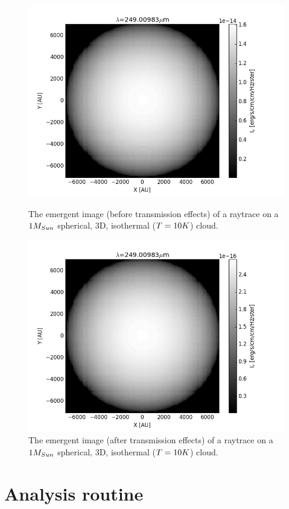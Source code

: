 \documentclass{report}
\begin{document}
\begin{figure}[!htb]
  \includegraphics[width=\linewidth]{../img/figure_1_no_trans.png}
  \caption{The emergent image (before transmission effects) of a raytrace on a $1\/M_{Sun}$ spherical, 3D, isothermal ($T=10\/K$) cloud.}\label{fig:np-trans}
\endminipage\hfill
{}
  \includegraphics[width=\linewidth]{../img/figure_1.png}
  \caption{The emergent image (after transmission effects) of a raytrace on a $1\/M_{Sun}$ spherical, 3D, isothermal ($T=10\/K$) cloud.}\label{fig:trans}
\endminipage
\end{figure}

\section{Analysis routine}
\end{document}
